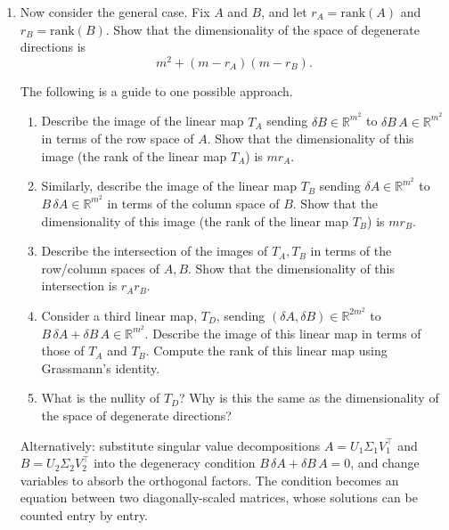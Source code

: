 \documentclass[11pt]{article}
\newcommand{\R}{\mathbb{R}}
\newcommand{\rank}{\mathrm{rank}}
\begin{document}
\begin{exercise}
\begin{enumerate}
    \item
        \label{ex:dln-degeneracy:general-rank}
        Now consider the general case. Fix $A$ and $B$, and let $r_A = \rank(A)$ and $r_B = \rank(B)$. Show that the dimensionality of the space of degenerate directions is
        $$
            m^2 + (m-r_A)(m-r_B).
        $$
        \begin{hint}
The following is a guide to one possible approach.
        \begin{enumerate}
            \item
                Describe the image of the linear map $T_A$
                sending
                    $\delta\!B \in \R^{m^2}$
                to
                    $\delta\!B\, A \in \R^{m^2}$
                in terms of the row space of $A$.
                Show that the dimensionality of this image (the rank of the linear map $T_A$) is $m r_A$.
            \item 
                Similarly, describe the image of the linear map $T_B$
                sending
                    $\delta\!A \in \R^{m^2}$
                to
                    $B\, \delta\!A \in \R^{m^2}$
                in terms of the column space of $B$.
                Show that the dimensionality of this image (the rank of the linear map $T_B$) is $m r_B$.
            \item 
                Describe the intersection of the images of $T_A, T_B$ in terms of the row/column spaces of $A, B$. Show that the dimensionality of this intersection is $r_A r_B$.
            \item
                Consider a third linear map, $T_D$,
                sending
                    $(\delta\!A, \delta\!B) \in \R^{2m^2}$
                to 
                    $B\,\delta\!A + \delta\!B\, A \in \R^{m^2}$.
                Describe the image of this linear map in terms of those of $T_A$ and $T_B$.
                Compute the rank of this linear map using Grassmann's identity.
            \item
                What is the nullity of $T_D$? Why is this the same as the dimensionality of the space of degenerate directions?
        \end{enumerate}
        Alternatively: substitute singular value decompositions
        $A = U_1 \Sigma_1 V_1^\top$ and $B = U_2 \Sigma_2 V_2^\top$ into the
        degeneracy condition $B\,\delta\!A + \delta\!B\, A = 0$, and change
        variables to absorb the orthogonal factors. The condition becomes an
        equation between two diagonally-scaled matrices, whose solutions can
        be counted entry by entry.
    \end{hint}
\end{enumerate}
\end{exercise}
\end{document}
